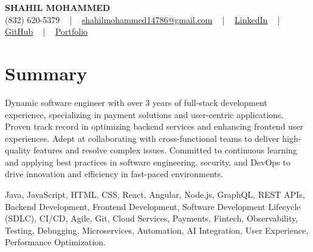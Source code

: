 \documentclass[letterpaper,10pt]{article}
\begin{document}
\begin{center}
    {\fontsize{14pt}{12pt}\selectfont \textbf{\MakeUppercase{Shahil Mohammed}}}\\ \vspace{2pt}
    \fontsize{10pt}{12pt}\selectfont (832) 620-5379 ~ | ~ \href{mailto:shahilmohammed14786@gmail.com}{shahilmohammed14786@gmail.com} ~ | ~  
    \href{https://www.linkedin.com/in/shahil-mohammed-9652931a1/}{\color{blue}\underline{LinkedIn}}  ~ | ~ 
    \href{https://github.com/freakbeast14}{\color{blue}\underline{GitHub}} ~ | ~ 
    \href{https://shahil-mohammed.netlify.app/}{\color{blue}\underline{Portfolio}}
    \vspace{-8pt}
\end{center}

\section{Summary}
\vspace{-2pt}\fontsize{8pt}{9pt}\selectfont
Dynamic software engineer with over 3 years of full-stack development experience, specializing in payment solutions and user-centric applications. Proven track record in optimizing backend services and enhancing frontend user experiences. Adept at collaborating with cross-functional teams to deliver high-quality features and resolve complex issues. Committed to continuous learning and applying best practices in software engineering, security, and DevOps to drive innovation and efficiency in fast-paced environments.
 \vspace{-5pt}
 
{\fontsize{1pt}{1pt}\selectfont\color{white}
Java, JavaScript, HTML, CSS, React, Angular, Node.js, GraphQL, REST APIs, Backend Development, Frontend Development, Software Development Lifecycle (SDLC), CI/CD, Agile, Git, Cloud Services, Payments, Fintech, Observability, Testing, Debugging, Microservices, Automation, AI Integration, User Experience, Performance Optimization.
}
\vspace{-8pt}

\vspace{-2pt}
\end{document}
